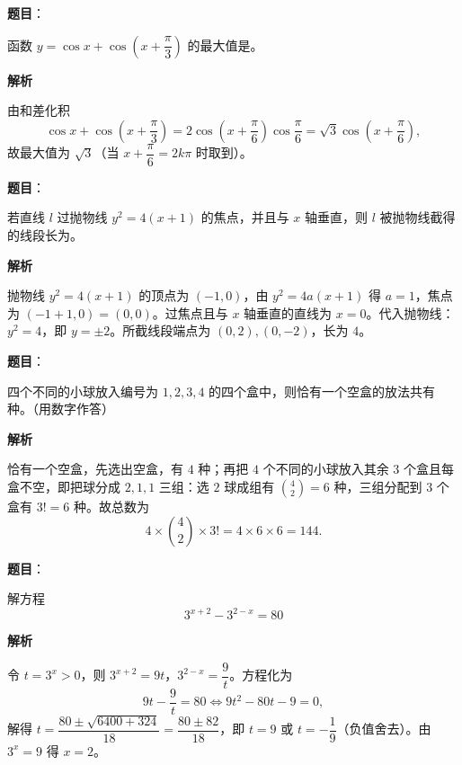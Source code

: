 \begin{answer}

\textbf{题目}：

函数 $y=\cos x+\cos\left(x+\dfrac\pi3\right)$ 的最大值是\underline{\qquad\qquad}。

\textbf{解析}

由和差化积
\nopagebreak[4]
\[\cos x+\cos\left(x+\frac\pi3\right)=2\cos\left(x+\frac\pi6\right)\cos\frac\pi6=\sqrt3\cos\left(x+\frac\pi6\right),\]
故最大值为 $\sqrt3$（当 $x+\dfrac\pi6=2k\pi$ 时取到）。


\end{answer}
\begin{answer}

\textbf{题目}：

若直线 $l$ 过抛物线 $y^2=4(x+1)$ 的焦点，并且与 $x$ 轴垂直，则 $l$ 被抛物线截得的线段长为\underline{\qquad\qquad}。

\textbf{解析}

抛物线 $y^2=4(x+1)$ 的顶点为 $(-1,0)$，由 $y^2=4a(x+1)$ 得 $a=1$，焦点为 $(-1+1,0)=(0,0)$。过焦点且与 $x$ 轴垂直的直线为 $x=0$。代入抛物线：$y^2=4$，即 $y=\pm2$。所截线段端点为 $(0,2),(0,-2)$，长为 $4$。


\end{answer}
\begin{answer}

\textbf{题目}：

四个不同的小球放入编号为 $1,2,3,4$ 的四个盒中，则恰有一个空盒的放法共有\underline{\qquad\qquad}种。（用数字作答）

\textbf{解析}

恰有一个空盒，先选出空盒，有 $4$ 种；再把 $4$ 个不同的小球放入其余 $3$ 个盒且每盒不空，即把球分成 $2,1,1$ 三组：选 $2$ 球成组有 $\binom42=6$ 种，三组分配到 $3$ 个盒有 $3!=6$ 种。故总数为
\nopagebreak[4]
\[4\times\binom42\times3!=4\times6\times6=144.\]


\end{answer}
\begin{answer}

\textbf{题目}：

解方程
\nopagebreak[4]
\[
3^{x+2}-3^{2-x}=80
\]

\textbf{解析}

令 $t=3^x>0$，则 $3^{x+2}=9t$，$3^{2-x}=\dfrac9t$。方程化为
\nopagebreak[4]
\[9t-\frac9t=80\iff 9t^2-80t-9=0,\]
解得 $t=\dfrac{80\pm\sqrt{6400+324}}{18}=\dfrac{80\pm82}{18}$，即 $t=9$ 或 $t=-\dfrac19$（负值舍去）。由 $3^x=9$ 得 $x=2$。


\end{answer}
